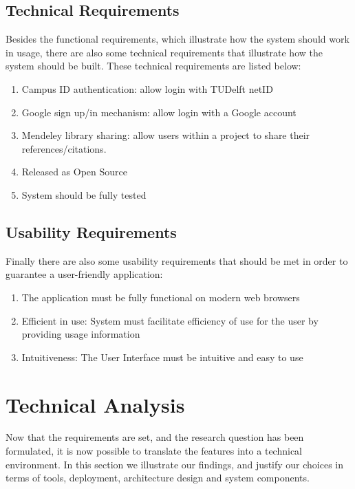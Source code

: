 \subsection{Technical Requirements} %
\label{sub:technical_requirements}

Besides the functional requirements, which illustrate how the system should work in usage, there are also some technical requirements that illustrate how the system should be built. These technical requirements are listed below:

\begin{enumerate}
	\item Campus ID authentication: allow login with TUDelft netID
	\item Google sign up/in mechanism: allow login with a Google account
	\item Mendeley library sharing: allow users within a project to share their references/citations.
	\item Released as Open Source
 	\item System should be fully tested 
\end{enumerate}

\subsection{Usability Requirements} %

Finally there are also some usability requirements that should be met in order to guarantee a user-friendly application:

\label{sub:usability_requirements}
\begin{enumerate}
	\item The application must be fully functional on modern web browsers
	\item Efficient in use: System must facilitate efficiency of use for the user by providing usage information
	\item Intuitiveness: The User Interface must be intuitive and easy to use
\end{enumerate}
\newpage
\section{Technical Analysis} %

Now that the requirements are set, and the research question has been formulated, it is now possible to translate the features into a technical environment. In this section we illustrate our findings, and justify our choices in terms of tools, deployment, architecture design and system components.

